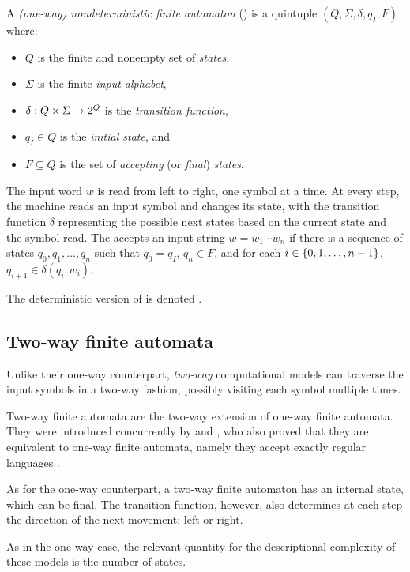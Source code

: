 \begin{defn}
	A \emph{(one-way) nondeterministic finite automaton} (\ONFA) is a quintuple $(Q,\Sigma,\delta,q_I,F)$ where:
	\begin{itemize}
		\item $Q$ is the finite and nonempty set of \emph{states},
		\item $\Sigma$ is the finite \emph{input alphabet},
		\item $\delta:Q\times\Sigma\to2^{Q}$ is the \emph{transition function},
		\item $q_I\in Q$ is the \emph{initial state}, and
		\item $F\subseteq Q$ is the set of \emph{accepting} (or \emph{final}) \emph{states}.
	\end{itemize}
	The input word $w$ is read from left to right, one symbol at a time.
	At every step, the machine reads an input symbol and changes its state, with the transition function $\delta$ representing the possible next states based on the current state and the symbol read.
	The \ONFA accepts an input string $w=w_1\cdots w_n$ if there is a sequence of states $q_0,q_1,\dots,q_n$ such that $q_0=q_I$, $q_n\in F$, and for each $i\in\{0,1,\dots,n-1\}$, $q_{i+1}\in\delta(q_i,w_i)$.

	\noindent The deterministic version of \ONFAs is denoted \ODFAs.
\end{defn}


\subsection{Two-way finite automata}
Unlike their one-way counterpart, \emph{two-way} computational models can traverse the input symbols in a two-way fashion, possibly visiting each symbol multiple times.

Two-way finite automata are the two-way extension of one-way finite automata.
They were introduced concurrently by \citeauthor{RabSco59} and \citeauthor{She59}, who also proved that they are equivalent to one-way finite automata, namely they accept exactly regular languages \cite{RabSco59,She59}.

As for the one-way counterpart, a two-way finite automaton has an internal state, which can be final.
The transition function, however, also determines at each step the direction of the next movement: left or right.

As in the one-way case, the relevant quantity for the descriptional complexity of these models is the number of states.

